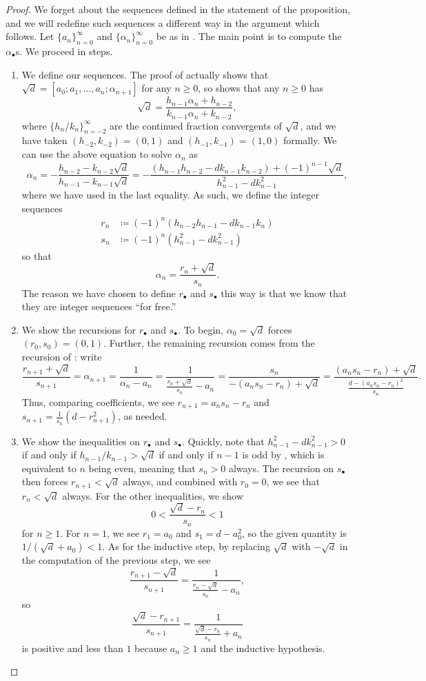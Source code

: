 \documentclass[../notes.tex]{subfiles}
\begin{document}
\begin{proof}
	We forget about the sequences defined in the statement of the proposition, and we will redefine such sequences a different way in the argument which follows. Let $\{a_n\}_{n=0}^\infty$ and $\{\alpha_n\}_{n=0}^\infty$ be as in . The main point is to compute the $\alpha_\bullet$s. We proceed in steps.
	\begin{enumerate}
		\item We define our sequences. The proof of  actually shows that $\sqrt d=[a_0;a_1,\ldots,a_n;\alpha_{n+1}]$ for any $n\ge0$, so  shows that any $n\ge0$ has
		\[\sqrt d=\frac{h_{n-1}\alpha_{n}+h_{n-2}}{k_{n-1}\alpha_{n}+k_{n-2}},\]
		where $\{h_n/k_n\}_{n=-2}^\infty$ are the continued fraction convergents of $\sqrt d$, and we have taken $(h_{-2},k_{-2})=(0,1)$ and $(h_{-1},k_{-1})=(1,0)$ formally. We can use the above equation to solve $\alpha_{n}$ as
		\[\alpha_n=-\frac{h_{n-2}-k_{n-2}\sqrt d}{h_{n-1}-k_{n-1}\sqrt d}=-\frac{(h_{n-1}h_{n-2}-dk_{n-1}k_{n-2})+(-1)^{n-1}\sqrt d}{h_{n-1}^2-dk_{n-1}^2},\]
		where we have used  in the last equality. As such, we define the integer sequences
		\begin{align*}
			r_n &\coloneqq (-1)^{n}(h_{n-2}h_{n-1}-dk_{n-1}k_n) \\
			s_n &\coloneqq (-1)^{n}\left(h_{n-1}^2-dk_{n-1}^2\right)
		\end{align*}
		so that
		\[\alpha_n=\frac{r_n+\sqrt d}{s_n}.\]
		The reason we have chosen to define $r_\bullet$ and $s_\bullet$ this way is that we know that they are integer sequences ``for free.''
		\item We show the recursions for $r_\bullet$ and $s_\bullet$. To begin, $\alpha_0=\sqrt d$ forces $(r_0,s_0)=(0,1)$. Further, the remaining recursion comes from the recursion of : write
		\[\frac{r_{n+1}+\sqrt d}{s_{n+1}}=\alpha_{n+1}=\frac1{\alpha_n-a_n}=\dfrac1{\frac{r_n+\sqrt d}{s_n}-a_n}=\frac{s_n}{-(a_ns_n-r_n)+\sqrt d}=\dfrac{(a_ns_n-r_n)+\sqrt d}{\frac{d-(a_ns_n-r_n)^2}{s_n}}.\]
		Thus, comparing coefficients, we see $r_{n+1}=a_ns_n-r_n$ and $s_{n+1}=\frac1{s_n}\left(d-r_{n+1}^2\right)$, as needed.
		\item We show the inequalities on $r_\bullet$ and $s_\bullet$. Quickly, note that $h_{n-1}^2-dk_{n-1}^2>0$ if and only if $h_{n-1}/k_{n-1}>\sqrt d$ if and only if $n-1$ is odd by , which is equivalent to $n$ being even, meaning that $s_n>0$ always. The recursion on $s_\bullet$ then forces $r_{n+1}<\sqrt d$ always, and combined with $r_0=0$, we see that $r_n<\sqrt d$ always. For the other inequalities, we show
		\[0<\frac{\sqrt d-r_n}{s_n}<1\]
		for $n\ge1$. For $n=1$, we see $r_1=a_0$ and $s_1=d-a_0^2$, so the given quantity is $1/\left(\sqrt d+a_0\right)<1$. As for the inductive step, by replacing $\sqrt d$ with $-\sqrt d$ in the computation of the previous step, we see
		\[\frac{r_{n+1}-\sqrt d}{s_{n+1}}=\dfrac1{\frac{r_n-\sqrt d}{s_n}-a_n},\]
		so
		\[\frac{\sqrt d-r_{n+1}}{s_{n+1}}=\dfrac1{\frac{\sqrt d-r_n}{s_n}+a_n}\]
		is positive and less than $1$ because $a_n\ge1$ and the inductive hypothesis.


\end{enumerate}
\end{proof}
\end{document}

